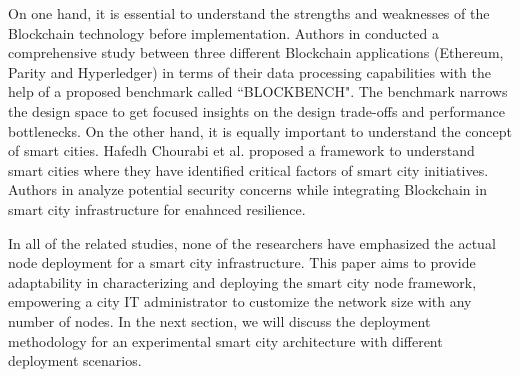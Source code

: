 On one hand, it is essential to understand the strengths and weaknesses of the Blockchain technology before implementation. Authors in \cite{dinh_untangling_2018} conducted a comprehensive study between three different Blockchain applications (Ethereum, Parity and Hyperledger) in terms of their data processing capabilities with the help of a proposed benchmark called ``BLOCKBENCH". The benchmark narrows the design space to get focused insights on the design trade-offs and performance bottlenecks. On the other hand, it is equally important to understand the concept of smart cities. Hafedh Chourabi et al. \cite{chourabi_understanding_2012} proposed a framework to understand smart cities where they have identified critical factors of smart city initiatives. Authors in \cite{liangsmartcity} analyze potential security concerns while integrating Blockchain in smart city infrastructure for enahnced resilience.

In all of the related studies, none of the researchers have emphasized the actual node deployment for a smart city infrastructure. This paper aims to provide adaptability in characterizing and deploying the smart city node framework, empowering a city IT administrator to customize the network size with any number of nodes. In the next section, we will discuss the deployment methodology for an experimental smart city architecture with different deployment scenarios.  
